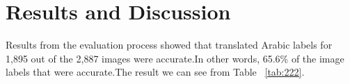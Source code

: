 \documentclass[10pt,twocolumn,letterpaper]{article}
\begin{document}
\section{Results and Discussion}
Results from the evaluation process showed that translated Arabic labels for 1,895 out of the 2,887 images were accurate.In other words, 65.6\% of the image labels
that were accurate.The result we can see from Table ~\ref{tab:222}.





{\small


}
\end{document}
